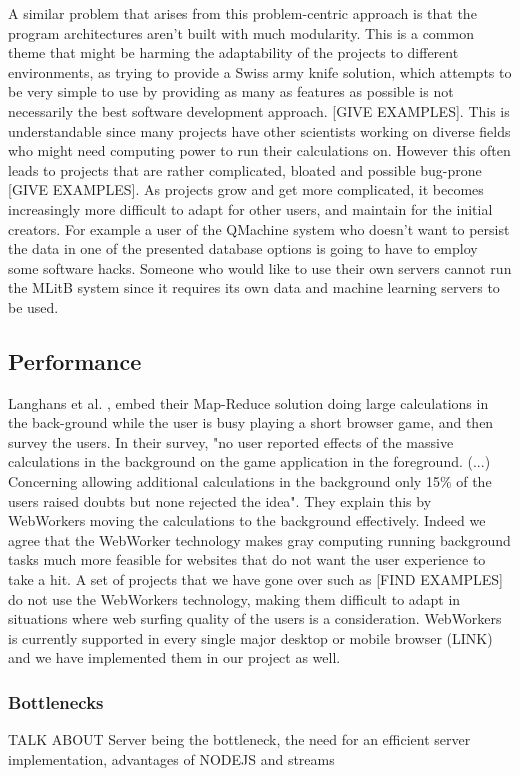 A similar problem that arises from this problem-centric approach is that the program architectures aren't built with much modularity. This is a common theme that might be harming the adaptability of the projects to different environments, as trying to provide a Swiss army knife solution, which attempts to be very simple to use by providing as many as features as possible is not necessarily the best software development approach. [GIVE EXAMPLES]. 
This is understandable since many projects have other scientists working on diverse fields who might need computing power to run their calculations on. However this often leads to projects that are rather complicated, bloated and possible bug-prone [GIVE EXAMPLES]. As projects grow and get more complicated, it becomes increasingly more difficult to adapt for other users, and maintain for the initial creators. 
For example a user of the QMachine system who doesn't want to persist the data in one of the presented database options is going to have to employ some software hacks. Someone who would like to use their own servers cannot run the MLitB system since it requires its own data and machine learning servers to be used.

\subsection{Performance}
Langhans et al. \cite{langhans2013crowdsourcing}, embed their Map-Reduce solution doing large calculations in the back-ground while the user is busy playing a short browser game, and then survey the users. In their survey, "no user reported effects of the massive calculations in the background on the game application in the foreground. (...) Concerning allowing additional calculations in the background only 15\% of the users raised doubts but none rejected the idea". They explain this by WebWorkers moving the calculations to the background effectively. Indeed we agree that the WebWorker technology makes gray computing running background tasks much more feasible for websites that do not want the user experience to take a hit. A set of projects that we have gone over such as [FIND EXAMPLES] do not use the WebWorkers technology, making them difficult to adapt in situations where web surfing quality of the users is a consideration. WebWorkers is currently supported in every single major desktop or mobile browser (LINK) and we have implemented them in our project as well.

\subsubsection{Bottlenecks}
TALK ABOUT Server being the bottleneck, the need for an efficient server implementation, advantages of NODEJS and streams

